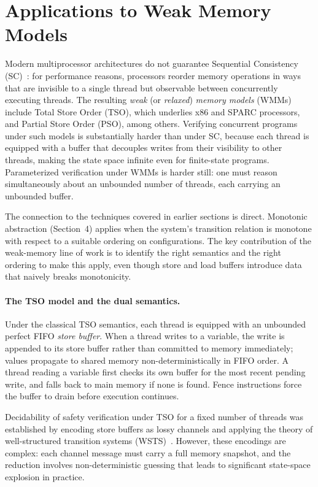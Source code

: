 \section{Applications to Weak Memory Models}

Modern multiprocessor architectures do not guarantee Sequential Consistency
(SC)~\cite{Lam79}: for performance reasons, processors reorder memory
operations in ways that are invisible to a single thread but observable
between concurrently executing threads. The resulting \emph{weak} (or
\emph{relaxed}) \emph{memory models} (WMMs) include Total Store Order (TSO),
which underlies x86 and SPARC processors, and Partial Store Order (PSO),
among others. Verifying concurrent programs under such models is substantially
harder than under SC, because each thread is equipped with a buffer that
decouples writes from their visibility to other threads, making the state
space infinite even for finite-state programs. Parameterized verification
under WMMs is harder still: one must reason simultaneously about an unbounded
number of threads, each carrying an unbounded buffer.

The connection to the techniques covered in earlier sections is direct.
Monotonic abstraction (Section~4) applies when the system's transition relation
is monotone with respect to a suitable ordering on configurations. The key
contribution of the weak-memory line of work is to identify the right
semantics and the right ordering to make this apply, even though store and
load buffers introduce data that naively breaks monotonicity.

\paragraph{The TSO model and the dual semantics.}
Under the classical TSO semantics, each thread is equipped with an unbounded
perfect FIFO \emph{store buffer}. When a thread writes to a variable, the
write is appended to its store buffer rather than committed to memory
immediately; values propagate to shared memory non-deterministically in FIFO
order. A thread reading a variable first checks its own buffer for the most
recent pending write, and falls back to main memory if none is found. Fence
instructions force the buffer to drain before execution continues.

Decidability of safety verification under TSO for a fixed number of threads
was established by encoding store buffers as lossy channels and applying the
theory of well-structured transition systems (WSTS)~\cite{ABBM10}. However,
these encodings are complex: each channel message must carry a full memory
snapshot, and the reduction involves non-deterministic guessing that leads to
significant state-space explosion in practice.

